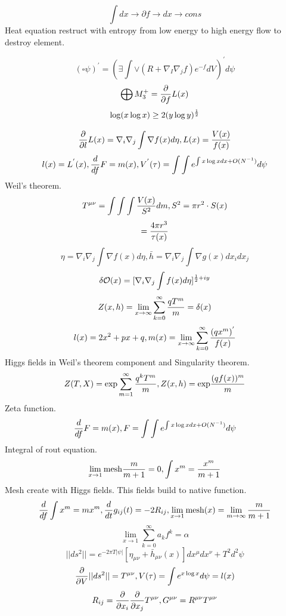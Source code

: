 \documentclass{jsarticle}
\begin{document}
{  $$ \int dx \to \partial f \to dx \to cons $$
  Heat equation restruct with entropy from low energy to high energy flow to destroy element.

  $$ (\square \psi)^{'} = (\exists \int \vee (R + \nabla_{I}\nabla_{j} f)e^{-f}dV)^{'}d \psi $$
  $$ \bigoplus M^{+}_3 = {\partial \over \partial f}L(x) $$
  $$ \log (x \log x) \ge 2 (y \log y)^{1 \over 2} $$


  $$ {\partial \over \partial l}L(x) = \nabla_{i}\nabla_{j} \int \nabla f(x) d \eta, L(x) = {V(x) \over f(x)} $$
  $$ l(x) = L^{'}(x), {d \over df}F = m(x), V^{'}(\tau) = \int \int e^{\int x \log xdx + O(N^{-1})}d \psi $$
  Weil's theorem.
  $$ T^{\mu\nu} = \int \int \int {V(x) \over S^2}dm, S^2 = \pi r^2 \cdot S(x) $$
  $$ = {4 \pi r^3 \over \tau(x)} $$
  $$ \eta = \nabla_{i}\nabla_{j} \int \nabla f(x) d \eta, \bar{h} = \nabla_{i}\nabla_{j} \int \nabla 
  g(x) dx_{i}dx_{j} $$ 
  $$ \delta \mathcal{O}(x) = [\nabla_{i}\nabla_{j} \int f(x) d \eta]^{{1 \over 2} + iy} $$
  $$ Z(x,h) = \lim_{x \to \infty}\sum_{k=0}^{\infty} {q T^m \over m} = \delta(x) $$
  $$ l(x) = 2 x^2 + px + q, m(x) = \lim_{x \to \infty} \sum_{k=0}^{\infty} {(q x^m)^{'} \over f(x)} $$
  Higgs fields in Weil's theorem component and Singularity theorem.
  $$ Z(T,X) = \mathrm{exp} \sum_{m= 1}^{\infty} {q ^k T^m \over m}, Z(x,h) = \mathrm{exp}{(q f(x))^m \over m} $$
  Zeta function.
  $$ {d \over df}F = m(x), F= \int \int e^{\int x \log x dx + O(N^{-1})} d \psi $$
  Integral of rout equation. 
  $$ \lim_{x \to 1}\mathrm{mesh}
  {m \over m + 1} = 0, \int x^m = {x^m \over m + 1} $$
  Mesh create with Higgs fields.
  This fields build to native function.
  $$ {d \over df}\int x^m = m x^m, {d \over dt}g_{ij}(t)
  = - 2 R_{ij}, \lim_{x \to 1} \mathrm{mesh}(x) = \lim_{m \to \infty}{m \over m + 1} $$
  $$ \lim_{x \to 1} \sum_{k=0}^{\infty} a_k f^k = \alpha $$
  $$ ||ds^2|| = e^{- 2 \pi T |\psi|}[\eta_{\mu\nu} + \bar{h}_{\mu\nu}(x)]dx^{\mu}dx^{\nu} + T^2 d^2 \psi $$
  $$ {\partial \over \partial V}||ds^2|| = T^{\mu\nu}, V(\tau) = \int e^{x \log x}d \psi= l(x) $$
  $$ R_{ij} = {\partial \over \partial x_{i}}{\partial \over \partial x_{j}} T^{\mu\nu}, 
  G^{\mu\nu} = R^{\mu\nu} T^{\mu\nu} $$


}
\end{document}
